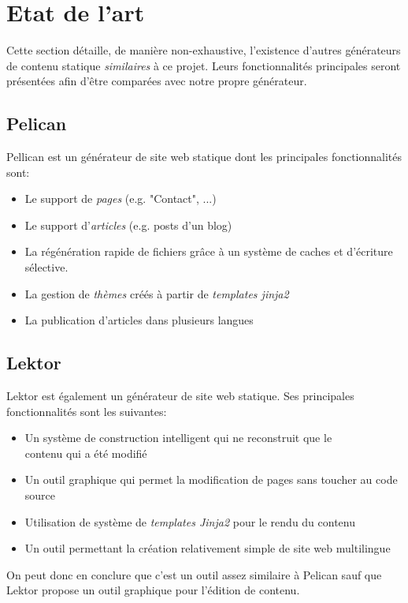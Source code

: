\section{Etat de l'art}
	
	Cette section détaille, de manière non-exhaustive, l'existence d'autres générateurs de contenu statique \textit{similaires} à ce projet. Leurs fonctionnalités principales seront présentées afin d'être comparées avec notre propre générateur.
	
	\subsection*{Pelican}
	Pellican \cite{Pellican} est un générateur de site web statique dont les principales fonctionnalités sont:
	\begin{itemize}
		\item Le support de \textit{pages} (e.g. "Contact", ...)
		\item Le support d'\textit{articles} (e.g. posts d'un blog)
		\item La régénération rapide de fichiers grâce à un système de caches et d'écriture sélective.
		\item La gestion de \textit{thèmes} créés à partir de \textit{templates jinja2}
		\item La publication d'articles dans plusieurs langues
	\end{itemize}
	
	\subsection*{Lektor}
	Lektor \cite{Lektor} est également un générateur de site web statique. Ses principales fonctionnalités sont les suivantes:
	
	\begin{itemize}
		\item Un système de construction intelligent qui ne reconstruit que le \\ 
		contenu qui a été modifié
		\item Un outil graphique qui permet la modification de pages sans toucher au code source
		\item Utilisation de système de \textit{templates Jinja2} pour le rendu du contenu
		\item Un outil permettant la création relativement simple de site web multilingue
	\end{itemize}
	
	On peut donc en conclure que c'est un outil assez similaire à Pelican \cite{Pellican} sauf que Lektor \cite{Lektor} propose un outil graphique pour l'édition de contenu.
	
